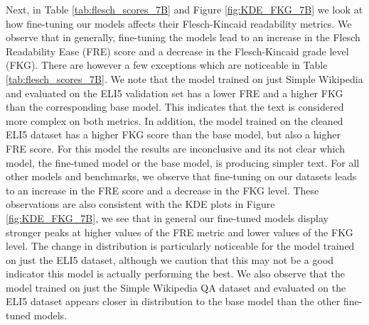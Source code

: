 \documentclass[11pt, oneside]{article}   	%
\begin{document}
Next, in Table \ref{tab:flesch_scores_7B} and Figure \ref{fig:KDE_FKG_7B} we look at how fine-tuning our models affects their Flesch-Kincaid readability metrics.
We observe that in generally, fine-tuning the models lead to an increase in the Flesch Readability Ease (FRE) score and a decrease in the Flesch-Kincaid grade level (FKG). 
There are however a few exceptions which are noticeable in Table \ref{tab:flesch_scores_7B}.
We note that the model trained on just Simple Wikipedia and evaluated on the ELI5 validation set has a lower FRE and a higher FKG than the corresponding base model.
This indicates that the text is considered more complex on both metrics.
In addition, the model trained on the cleaned ELI5 dataset has a higher FKG score than the base model, but also a higher FRE score.
For this model the results are inconclusive and its not clear which model, the fine-tuned model or the base model, is producing simpler text.
For all other models and benchmarks, we observe that fine-tuning on our datasets leads to an increase in the FRE score and a decrease in the FKG level.
These observations are also consistent with the KDE plots in Figure \ref{fig:KDE_FKG_7B}, we see that in general our fine-tuned models display stronger peaks at higher values of the FRE metric and lower values of the FKG level.
The change in distribution is particularly noticeable for the model trained on just the ELI5 dataset, although we caution that this may not be a good indicator this model is actually performing the best.
We also observe that the model trained on just the Simple Wikipedia QA dataset and evaluated on the ELI5 dataset appears closer in distribution to the base model than the other fine-tuned models.
\end{document}
